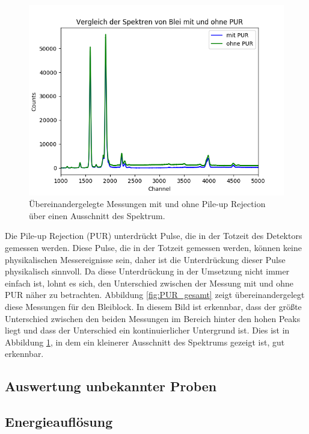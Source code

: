 \documentclass[12pt,a4paper]{article}
\begin{document}
\begin{figure}
\centering
\includegraphics[scale=0.8]{Bilder/roentgen/PUR/Ausschnitt.png}
\caption{Übereinandergelegte Messungen mit und ohne Pile-up Rejection über einen Ausschnitt des Spektrum.}
\label{fig:PUR_ausschnitt}
\end{figure}

Die Pile-up Rejection (PUR) unterdrückt Pulse, die in der Totzeit des Detektors gemessen werden. Diese Pulse, die in der Totzeit gemessen werden, können keine physikalischen Messereignisse sein, daher ist die Unterdrückung dieser Pulse physikalisch sinnvoll. Da diese Unterdrückung in der Umsetzung nicht immer einfach ist, lohnt es sich, den Unterschied zwischen der Messung mit und ohne PUR näher zu betrachten. Abbildung \ref{fig:PUR_gesamt} zeigt übereinandergelegt diese Messungen für den Bleiblock. In diesem Bild ist erkennbar, dass der größte Unterschied zwischen den beiden Messungen im Bereich hinter den hohen Peaks liegt und dass der Unterschied ein kontinuierlicher Untergrund ist. Dies ist in Abbildung \ref{fig:PUR_ausschnitt}, in dem ein kleinerer Ausschnitt des Spektrums gezeigt ist, gut erkennbar.

\subsection{Auswertung unbekannter Proben}
\subsection{Energieauflösung}
\end{document}
